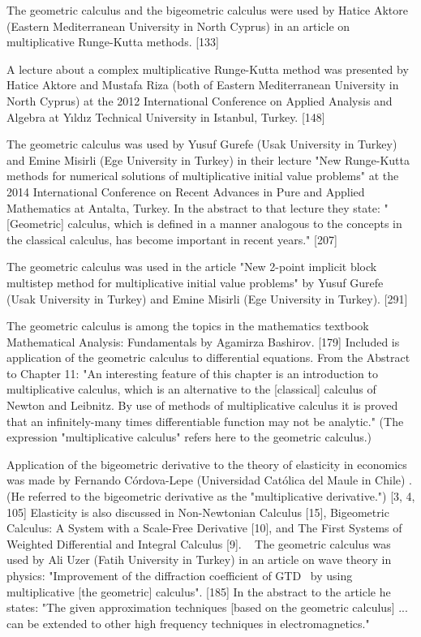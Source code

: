 \documentclass[12pt]{article}
\begin{document}
The geometric calculus and the bigeometric calculus were used by Hatice Aktore (Eastern Mediterranean University in North Cyprus) in an article on multiplicative Runge-Kutta methods. [133]

A lecture about a complex multiplicative Runge-Kutta method was presented by Hatice Aktore and Mustafa Riza (both of Eastern Mediterranean University in North Cyprus) at the 2012 International Conference on Applied Analysis and Algebra at Yıldız Technical University in Istanbul, Turkey. [148]

The geometric calculus was used by Yusuf Gurefe (Usak University in Turkey) and Emine Misirli (Ege University in Turkey) in their lecture "New Runge-Kutta methods for numerical solutions of multiplicative initial value problems" at the 2014 International Conference on Recent Advances in Pure and Applied Mathematics at Antalta, Turkey. In the abstract to that lecture they state: "[Geometric] calculus, which is defined in a manner analogous to the concepts in the classical calculus, has become important in recent years." [207]

The geometric calculus was used in the article "New 2-point implicit block multistep method for multiplicative initial value problems" by Yusuf Gurefe (Usak University in Turkey) and Emine Misirli (Ege University in Turkey). [291]

The geometric calculus is among the topics in the mathematics textbook Mathematical Analysis: Fundamentals by Agamirza Bashirov. [179] Included is application of the geometric calculus to differential equations. From the Abstract to Chapter 11: "An interesting feature of this chapter is an introduction to multiplicative calculus, which is an alternative to the [classical] calculus of Newton and Leibnitz. By use of methods of multiplicative calculus it is proved that an infinitely-many times differentiable function may not be analytic." (The expression "multiplicative calculus" refers here to the geometric calculus.)

Application of the bigeometric derivative to the theory of elasticity in economics was made by Fernando Córdova-Lepe (Universidad Católica del Maule in Chile) . (He referred to the bigeometric derivative as the "multiplicative derivative.") [3, 4, 105] Elasticity is also discussed in Non-Newtonian Calculus [15], Bigeometric Calculus: A System with a Scale-Free Derivative [10], and The First Systems of Weighted Differential and Integral Calculus [9].
 
The geometric calculus was used by Ali Uzer (Fatih University in Turkey) in an article on wave theory in physics: "Improvement of the diffraction coefficient of GTD  by using multiplicative [the geometric] calculus". [185] In the abstract to the article he states: "The given approximation techniques [based on the geometric calculus] ... can be extended to other high frequency techniques in electromagnetics."
\end{document}
